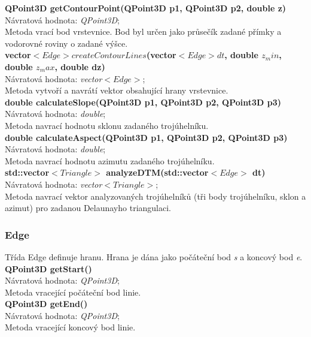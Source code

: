 \documentclass[a4paper, 12pt]{article}
\begin{document}
\textbf{QPoint3D getContourPoint(QPoint3D p1, QPoint3D p2, double z)}\\
Návratová hodnota: \textit{QPoint3D};\\
Metoda vrací bod vrstevnice. Bod byl určen jako průsečík zadané přímky a vodorovné roviny o zadané výšce.
\\

\textbf{vector$<Edge> createContourLines$(vector$<Edge> dt$, double $z_min$, double $z_max$, double dz)}\\
Návratová hodnota: \textit{vector$<Edge>$};\\
Metoda vytvoří a navrátí vektor obsahující hrany vrstevnice. 
\\

\textbf{double calculateSlope(QPoint3D p1, QPoint3D p2, QPoint3D p3)}\\
Návratová hodnota: \textit{double};\\
Metoda navrací hodnotu sklonu zadaného trojúhelníku. 
\\

\textbf{double calculateAspect(QPoint3D p1, QPoint3D p2, QPoint3D p3)}\\
Návratová hodnota: \textit{double};\\
Metoda navrací hodnotu azimutu zadaného trojúhelníku. 
\\

\textbf{std::vector$<Triangle>$ analyzeDTM(std::vector$<Edge>$ dt)}\\
Návratová hodnota: \textit{vector$<Triangle>$};\\
Metoda navrací vektor analyzovaných trojúhelníků (tři body trojúhelníku, sklon a azimut) pro zadanou Delaunayho triangulaci. 

\subsubsection{Edge}
Třída Edge definuje hranu. Hrana je dána jako počáteční bod \textit{s} a koncový bod \textit{e}.\\

\textbf{QPoint3D getStart()}\\
Návratová hodnota: \textit{QPoint3D};\\
Metoda vracející počáteční bod linie.
\\

\textbf{QPoint3D getEnd()}\\
Návratová hodnota: \textit{QPoint3D};\\
Metoda vracející koncový bod linie.
\\
\end{document}

